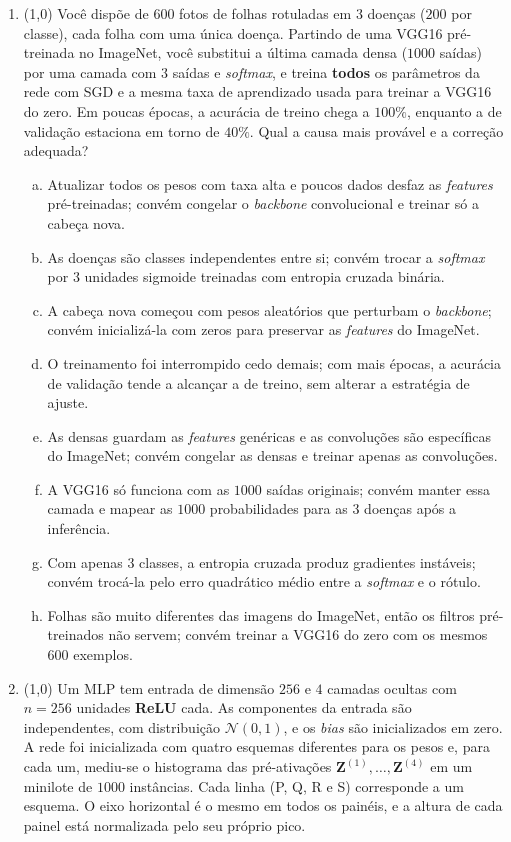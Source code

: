 \documentclass[11pt,a4paper]{article}
\begin{document}
\begin{enumerate}[1)]
\item (1{,}0) Você dispõe de $600$ fotos de folhas rotuladas em $3$ doenças ($200$ por classe), cada folha com uma única doença. Partindo de uma VGG16 pré-treinada no ImageNet, você substitui a última camada densa ($1000$ saídas) por uma camada com $3$ saídas e \textit{softmax}, e treina \textbf{todos} os parâmetros da rede com SGD e a mesma taxa de aprendizado usada para treinar a VGG16 do zero. Em poucas épocas, a acurácia de treino chega a $100\%$, enquanto a de validação estaciona em torno de $40\%$. Qual a causa mais provável e a correção adequada?
\begin{enumerate}[a)]
    \item Atualizar todos os pesos com taxa alta e poucos dados desfaz as \textit{features} pré-treinadas; convém congelar o \textit{backbone} convolucional e treinar só a cabeça nova.
    \item As doenças são classes independentes entre si; convém trocar a \textit{softmax} por $3$ unidades sigmoide treinadas com entropia cruzada binária.
    \item A cabeça nova começou com pesos aleatórios que perturbam o \textit{backbone}; convém inicializá-la com zeros para preservar as \textit{features} do ImageNet.
    \item O treinamento foi interrompido cedo demais; com mais épocas, a acurácia de validação tende a alcançar a de treino, sem alterar a estratégia de ajuste.
    \item As densas guardam as \textit{features} genéricas e as convoluções são específicas do ImageNet; convém congelar as densas e treinar apenas as convoluções.
    \item A VGG16 só funciona com as $1000$ saídas originais; convém manter essa camada e mapear as $1000$ probabilidades para as $3$ doenças após a inferência.
    \item Com apenas $3$ classes, a entropia cruzada produz gradientes instáveis; convém trocá-la pelo erro quadrático médio entre a \textit{softmax} e o rótulo.
    \item Folhas são muito diferentes das imagens do ImageNet, então os filtros pré-treinados não servem; convém treinar a VGG16 do zero com os mesmos $600$ exemplos.
\end{enumerate}

\item (1{,}0) Um MLP tem entrada de dimensão $256$ e $4$ camadas ocultas com $n = 256$ unidades \textbf{ReLU} cada. As componentes da entrada são independentes, com distribuição $\mathcal{N}(0, 1)$, e os \textit{bias} são inicializados em zero. A rede foi inicializada com quatro esquemas diferentes para os pesos e, para cada um, mediu-se o histograma das pré-ativações $\mathbf{Z}^{(1)}, \ldots, \mathbf{Z}^{(4)}$ em um minilote de $1000$ instâncias. Cada linha (P, Q, R e S) corresponde a um esquema. O eixo horizontal é o mesmo em todos os painéis, e a altura de cada painel está normalizada pelo seu próprio pico.


\end{enumerate}
\end{document}

